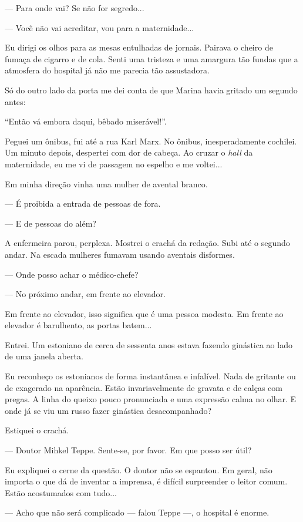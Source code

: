 --- Para onde vai? Se não for segredo...

--- Você não vai acreditar, vou para a maternidade...

Eu dirigi os olhos para as mesas entulhadas de jornais. Pairava o cheiro
de fumaça de cigarro e de cola. Senti uma tristeza e uma amargura tão
fundas que a atmosfera do hospital já não me parecia tão assustadora.

Só do outro lado da porta me dei conta de que Marina havia gritado um
segundo antes:

``Então vá embora daqui, bêbado miserável!''.

Peguei um ônibus, fui até a rua Karl Marx. No ônibus, inesperadamente
cochilei. Um minuto depois, despertei com dor de cabeça. Ao cruzar o
\emph{hall} da maternidade, eu me vi de passagem no espelho e me
voltei...

Em minha direção vinha uma mulher de avental branco.

--- É proibida a entrada de pessoas de fora.

--- E de pessoas do além?

A enfermeira parou, perplexa. Mostrei o crachá da redação. Subi até o
segundo andar. Na escada mulheres fumavam usando aventais disformes.

--- Onde posso achar o médico-chefe?

--- No próximo andar, em frente ao elevador.

Em frente ao elevador, isso significa que é uma pessoa modesta. Em
frente ao elevador é barulhento, as portas batem...

Entrei. Um estoniano de cerca de sessenta anos estava fazendo ginástica
ao lado de uma janela aberta.

Eu reconheço os estonianos de forma instantânea e infalível. Nada de
gritante ou de exagerado na aparência. Estão invariavelmente de gravata
e de calças com pregas. A linha do queixo pouco pronunciada e uma
expressão calma no olhar. E onde já se viu um russo fazer ginástica
desacompanhado?

Estiquei o crachá.

--- Doutor Mihkel Teppe. Sente-se, por favor. Em que posso ser útil?

Eu expliquei o cerne da questão. O doutor não se espantou. Em geral, não
importa o que dá de inventar a imprensa, é difícil surpreender o leitor
comum. Estão acostumados com tudo...

--- Acho que não será complicado --- falou Teppe ---, o hospital é
enorme.

